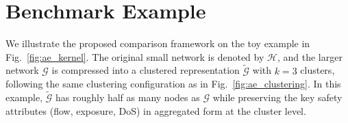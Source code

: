 \documentclass[lettersize,journal]{IEEEtran}
\begin{document}

\section{Benchmark Example}

We illustrate the proposed comparison framework on the toy example in
Fig.~\ref{fig:ae_kernel}.  
The original small network is denoted by $\mathcal{H}$, and the larger
network $\mathcal{G}$ is compressed into a clustered representation
$\tilde{\mathcal{G}}$ with $k=3$ clusters, following the same clustering
configuration as in Fig.~\ref{fig:ae_clustering}.  
In this example, $\tilde{\mathcal{G}}$ has roughly half as many nodes as
$\mathcal{G}$ while preserving the key safety attributes (flow, exposure,
DoS) in aggregated form at the cluster level.
\end{document}
